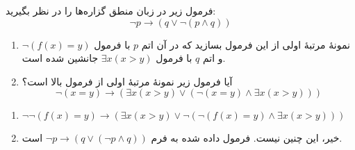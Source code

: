 
	فرمول زیر در زبان منطق گزاره‌ها را در نظر بگیرید:
	\[\neg p \rightarrow (q \vee \neg(p \wedge q))\]
	\begin{enumerate}[label=(\alph*)]
		\item نمونه‌ٔ مرتبهٔ اولی از این فرمول بسازید که در آن اتم $p$ با فرمول $\neg(f(x)=y)$ و اتم $q$ با فرمول $\exists x (x > y)$ جانشین شده است.
		\item آیا فرمول زیر نمونهٔ مرتبهٔ اولی از فرمول بالا است؟
		\[ \neg(x = y) \rightarrow (\exists x (x > y) \vee (\neg(x = y) \wedge \exists x (x > y))) \]
	\end{enumerate}
	
	\quad\vspace{0.5cm}
	\begin{ans}
		\begin{enumerate}[label=(\alph*)]
		\item $\neg \neg(f(x) = y) \rightarrow (\exists x (x > y) \vee \neg(\neg(f(x) = y) \wedge \exists x (x > y)))$
		\item خیر، این چنین نیست. فرمول داده شده به فرم $\neg p \rightarrow (q \vee (\neg p \wedge q))$ است.
		\end{enumerate}
	\end{ans}
